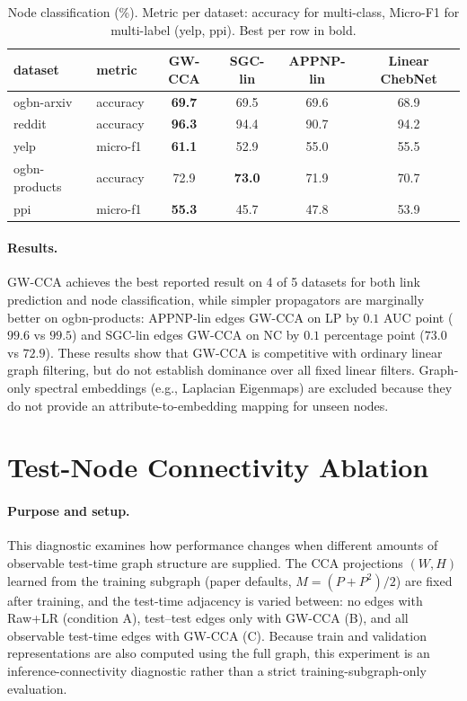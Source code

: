 \documentclass{article}
\begin{document}
\begin{table}[!h]
\centering
\small
\caption{Node classification (\%). Metric per dataset: accuracy for
multi-class, Micro-F1 for multi-label (yelp, ppi). Best per row in bold.}
\label{tab:baselines-nc}
\begin{tabular}{llcccc}
\toprule
dataset & metric & GW-CCA & SGC-lin & APPNP-lin & Linear ChebNet \\
\midrule
ogbn-arxiv    & accuracy & \textbf{69.7} & 69.5          & 69.6 & 68.9 \\
reddit        & accuracy & \textbf{96.3} & 94.4          & 90.7 & 94.2 \\
yelp          & micro-f1 & \textbf{61.1} & 52.9          & 55.0 & 55.5 \\
ogbn-products & accuracy & 72.9          & \textbf{73.0} & 71.9 & 70.7 \\
ppi           & micro-f1 & \textbf{55.3} & 45.7          & 47.8 & 53.9 \\
\bottomrule
\end{tabular}
\end{table}

\paragraph{Results.} GW-CCA achieves the best reported result on 4
of 5 datasets for both link prediction and node classification, while
simpler propagators are marginally better on ogbn-products: APPNP-lin
edges GW-CCA on LP by $0.1$ AUC point ($99.6$ vs $99.5$) and SGC-lin
edges GW-CCA on NC by $0.1$ percentage point ($73.0$ vs $72.9$). These
results show that GW-CCA is competitive with ordinary linear graph
filtering, but do not establish dominance over all fixed linear
filters. Graph-only spectral embeddings (e.g., Laplacian Eigenmaps)
are excluded because they do not provide an attribute-to-embedding
mapping for unseen nodes.

\section{Test-Node Connectivity Ablation}
\label{app:connectivity}
\paragraph{Purpose and setup.} This diagnostic examines how
performance changes when different amounts of observable test-time
graph structure are supplied. The CCA projections $(W, H)$ learned
from the training subgraph (paper defaults, $M = (P + P^{2})/2$) are
fixed after training, and the test-time adjacency is varied between:
no edges with Raw+LR (condition A), test--test edges only with
GW-CCA (B), and all observable test-time edges with GW-CCA (C).
Because train and validation representations are also computed using
the full graph, this experiment is an inference-connectivity diagnostic
rather than a strict training-subgraph-only evaluation.
\end{document}
